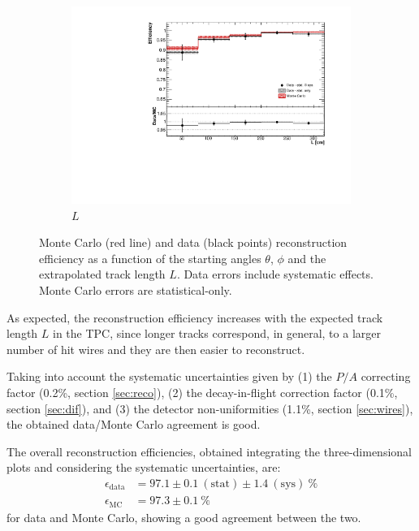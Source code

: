 \documentclass[a4paper,11pt]{article}
\begin{document}
\begin{figure}[htbp]
\begin{center}
\begin{subfigure}{0.5\textwidth}
      \includegraphics[width=\linewidth]{figures/l.pdf}
      \caption{$L$} \label{fig:l}
    \end{subfigure}
    \caption{Monte Carlo (red line) and data (black points) reconstruction efficiency as a function of the starting angles $\theta$, $\phi$ and the extrapolated track length $L$. Data errors include systematic effects. Monte Carlo errors are statistical-only.}\label{fig:1d}
  \end{center}
\end{figure}

As expected, the reconstruction efficiency increases with the expected track length $L$ in the TPC, since longer tracks correspond, in general, to a larger number of hit wires and they are then easier to reconstruct.

Taking into account the systematic uncertainties given by (1) the $P/A$ correcting factor (0.2\%, section \ref{sec:reco}), (2) the decay-in-flight correction factor (0.1\%, section \ref{sec:dif}), and (3) the detector non-uniformities (1.1\%, section \ref{sec:wires}), the obtained data/Monte Carlo agreement is good.%

The overall reconstruction efficiencies, obtained integrating the three-dimensional plots and considering the systematic uncertainties, are:
\begin{align*}
\epsilon_{\mathrm{data}} &= 97.1 \pm 0.1~\mathrm{(stat)} \pm 1.4~\mathrm{(sys)}~\%\\
\epsilon_{\mathrm{MC}} &= 97.3 \pm 0.1~\%
\end{align*} for data and Monte Carlo, showing a good agreement between the two.
\end{document}
